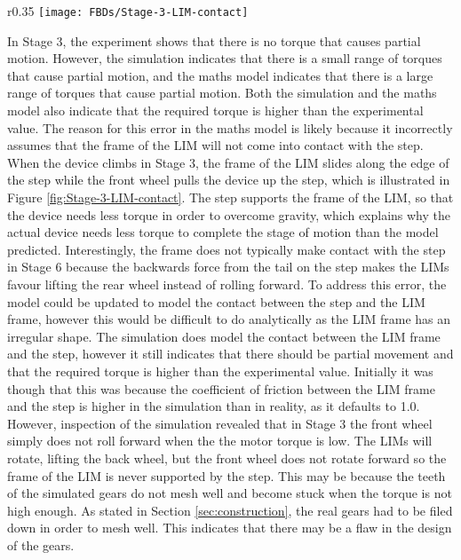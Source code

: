 \begin{wrapfigure}{r}{0.35\textwidth}
	\centering
	\texttt{[image: FBDs/Stage-3-LIM-contact]}
	\caption{Frame of the LIM making contact with the edge of the step in Stage 3}
	\label{fig:Stage-3-LIM-contact}
\end{wrapfigure}
In Stage 3, the experiment shows that there is no torque that causes partial motion. However, the simulation indicates that there is a small range of torques that cause partial motion, and the maths model indicates that there is a large range of torques that cause partial motion. Both the simulation and the maths model also indicate that the required torque is higher than the experimental value. The reason for this error in the maths model is likely because it incorrectly assumes that the frame of the LIM will not come into contact with the step. When the device climbs in Stage 3, the frame of the LIM slides along the edge of the step while the front wheel pulls the device up the step, which is illustrated in Figure \ref{fig:Stage-3-LIM-contact}.
The step supports the frame of the LIM, so that the device needs less torque in order to overcome gravity, which explains why the actual device needs less torque to complete the stage of motion than the model predicted. Interestingly, the frame does not typically make contact with the step in Stage 6 because the backwards force from the tail on the step makes the LIMs favour lifting the rear wheel instead of rolling forward. To address this error, the model could be updated to model the contact between the step and the LIM frame, however this would be difficult to do analytically as the LIM frame has an irregular shape. The simulation does model the contact between the LIM frame and the step, however it still indicates that there should be partial movement and that the required torque is higher than the experimental value. Initially it was though that this was because the coefficient of friction between the LIM frame and the step is higher in the simulation than in reality, as it defaults to 1.0. However, inspection of the simulation revealed that in Stage 3 the front wheel simply does not roll forward when the the motor torque is low. The LIMs will rotate, lifting the back wheel, but the front wheel does not rotate forward so the frame of the LIM is never supported by the step. This may be because the teeth of the simulated gears do not mesh well and become stuck when the torque is not high enough. As stated in Section \ref{sec:construction}, the real gears had to be filed down in order to mesh well. This indicates that there may be a flaw in the design of the gears.\\

